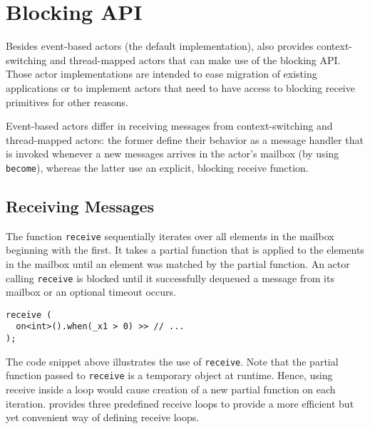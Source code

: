 \section{Blocking API}
\label{Sec::BlockingAPI}

Besides event-based actors (the default implementation), \libcppa also provides context-switching and thread-mapped actors that can make use of the blocking API.
Those actor implementations are intended to ease migration of existing applications or to implement actors that need to have access to blocking receive primitives for other reasons.

Event-based actors differ in receiving messages from context-switching and thread-mapped actors: the former define their behavior as a message handler that is invoked whenever a new messages arrives in the actor's mailbox (by using \lstinline^become^), whereas the latter use an explicit, blocking receive function.

\subsection{Receiving Messages}

The function \lstinline^receive^ sequentially iterates over all elements in the mailbox beginning with the first.
It takes a partial function that is applied to the elements in the mailbox until an element was matched by the partial function.
An actor calling \lstinline^receive^ is blocked until it successfully dequeued a message from its mailbox or an optional timeout occurs.

\begin{lstlisting}
receive (
  on<int>().when(_x1 > 0) >> // ...
);
\end{lstlisting}

The code snippet above illustrates the use of \lstinline^receive^.
Note that the partial function passed to \lstinline^receive^ is a temporary object at runtime.
Hence, using receive inside a loop would cause creation of a new partial function on each iteration.
\libcppa provides three predefined receive loops to provide a more efficient but yet convenient way of defining receive loops.

